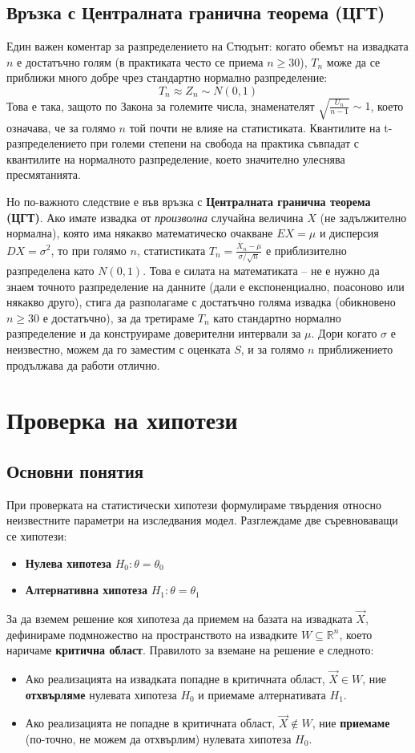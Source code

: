 \documentclass{article}
\begin{document}
\subsection{Връзка с Централната гранична теорема (ЦГТ)}
Един важен коментар за разпределението на Стюдънт: когато обемът на извадката $n$ е достатъчно голям (в практиката често се приема $n \ge 30$), $T_n$ може да се приближи много добре чрез стандартно нормално разпределение:
\[
T_n \approx Z_n \sim N(0,1)
\]
Това е така, защото по Закона за големите числа, знаменателят $\sqrt{\frac{U_n}{n-1}} \sim 1$, което означава, че за голямо $n$ той почти не влияе на статистиката. Квантилите на t-разпределението при големи степени на свобода на практика съвпадат с квантилите на нормалното разпределение, което значително улеснява пресмятанията.

Но по-важното следствие е във връзка с \textbf{Централната гранична теорема (ЦГТ)}. Ако имате извадка от \textit{произволна} случайна величина $X$ (не задължително нормална), която има някакво математическо очакване $EX = \mu$ и дисперсия $DX = \sigma^2$, то при голямо $n$, статистиката $T_n = \frac{\overline{X}_n - \mu}{\sigma/\sqrt{n}}$ е приблизително разпределена като $N(0,1)$.
Това е силата на математиката – не е нужно да знаем точното разпределение на данните (дали е експоненциално, поасоново или някакво друго), стига да разполагаме с достатъчно голяма извадка (обикновено $n \ge 30$ е достатъчно), за да третираме $T_n$ като стандартно нормално разпределение и да конструираме доверителни интервали за $\mu$. Дори когато $\sigma$ е неизвестно, можем да го заместим с оценката $S$, и за голямо $n$ приближението продължава да работи отлично.

\section{Проверка на хипотези}
\subsection{Основни понятия}
При проверката на статистически хипотези формулираме твърдения относно неизвестните параметри на изследвания модел. Разглеждаме две съревноваващи се хипотези:
\begin{itemize}
    \item \textbf{Нулева хипотеза} $H_0: \theta = \theta_0$
    \item \textbf{Алтернативна хипотеза} $H_1: \theta = \theta_1$
\end{itemize}
За да вземем решение коя хипотеза да приемем на базата на извадката $\vec{X}$, дефинираме подмножество на пространството на извадките $W \subseteq \mathbb{R}^n$, което наричаме \textbf{критична област}. 
Правилото за вземане на решение е следното:
\begin{itemize}
    \item Ако реализацията на извадката попадне в критичната област, $\vec{X} \in W$, ние \textbf{отхвърляме} нулевата хипотеза $H_0$ и приемаме алтернативата $H_1$.
    \item Ако реализацията не попадне в критичната област, $\vec{X} \notin W$, ние \textbf{приемаме} (по-точно, не можем да отхвърлим) нулевата хипотеза $H_0$.
\end{itemize}
\end{document}
